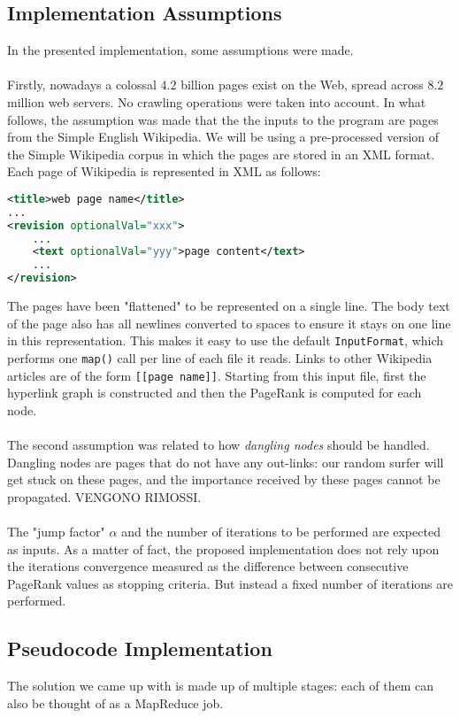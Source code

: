\documentclass[11pt,a4paper]{article}
\begin{document}
\subsection{Implementation Assumptions}
In the presented implementation, some assumptions were made.\\
\\
Firstly, 
nowadays a colossal $4.2$ billion pages exist on the Web, spread across $8.2$ million web servers. No crawling operations were taken into account. In what follows, the assumption was made that the the inputs to the program are pages from the Simple English Wikipedia. We will be using a pre-processed version of the Simple Wikipedia corpus in which the pages are stored in an XML format. Each page of Wikipedia is represented in XML as follows:
\begin{lstlisting}[language=xml]
<title>web page name</title>
...
<revision optionalVal="xxx">
    ...
    <text optionalVal="yyy">page content</text>
    ...
</revision>
\end{lstlisting}
The pages have been "flattened" to be represented on a single line. The body text of the page also has all newlines converted to spaces to ensure it stays on one line in this representation. This makes it easy to use the default \texttt{InputFormat}, which performs one \texttt{map()} call per line of each file it reads. Links to other Wikipedia articles are of the form \texttt{[[page name]]}. Starting from this input file, first the hyperlink graph is constructed and then the PageRank is computed for each node.\\
\\
The second assumption was related to how \textit{dangling nodes} should be handled. Dangling nodes are pages that do not have any out-links: our random surfer will get stuck on these pages, and  the importance received by these pages cannot be propagated. VENGONO RIMOSSI.\\
\\
The "jump factor" $\alpha$ and the number of iterations to be performed are expected as inputs. As a matter of fact, the proposed implementation does not rely upon the iterations convergence measured as the difference between consecutive PageRank values as stopping criteria. But instead a fixed number of iterations are performed.
\subsection{Pseudocode Implementation}
The solution we came up with is made up of multiple stages: each of them can also be thought of as a MapReduce job.
\end{document}
